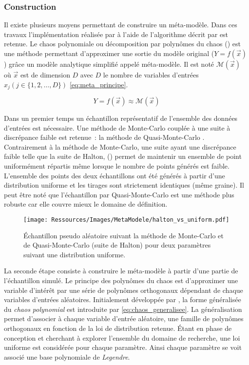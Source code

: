 \subsubsection{Construction} %
\label{ssub:construction}
Il existe plusieurs moyens permettant de construire un méta-modèle. Dans ces travaux
l’implémentation réalisée par \textcite{Rania2013} à l’aide de l’algorithme décrit par
\textcite{Malen2009} est retenue. Le chaos polynomiale ou décomposition par polynômes du
chaos () est une méthode permettant d’approximer une sortie du modèle original
($Y = f(\vec{x})$) grâce un modèle analytique simplifié appelé méta-modèle. Il est noté
$\mathcal{M}(\vec{x})$ où $\vec{x}$ est de dimension $D$ avec $D$ le nombre de variables d’entrées
$x_{j} (j \in \{1, 2, \dotsc, D\})$ \eqref{eq:meta_principe}.

\begin{equation}\label{eq:meta_principe}
  Y = f(\vec{x}) \approx \mathcal{M}(\vec{x})
\end{equation}

Dans un premier temps un échantillon représentatif de l’ensemble des données d’entrées est
nécessaire. Une méthode de Monte-Carlo couplée à une suite à discrépance faible est retenue~: la
méthode de Quasi-Monte-Carlo \parencite{Caflisch19981}. Contrairement à la méthode de
Monte-Carlo, une suite ayant une discrépance faible telle que la suite de Halton,
() permet de maintenir un ensemble de
point uniformément répartis même lorsque le nombre de points générés est faible.
L’ensemble des points des deux échantillons ont été générés à partir d’une
distribution uniforme et les tirages sont strictement identiques (même graine).
Il peut être noté que l’échantillon par Quasi-Monte-Carlo est une méthode plus robuste car elle
couvre mieux le domaine de définition.
\begin{figure}
    \centering
    \texttt{[image: Ressources/Images/MetaModele/halton\_vs\_uniform.pdf]}
    \caption[Échantillon suivant la méthode de Monte-Carlo et de Quasi-Monte-Carlo]
            {Échantillon pseudo aléatoire suivant la méthode de Monte-Carlo et de
             Quasi-Monte-Carlo (suite de Halton) pour deux paramètres suivant une
             distribution uniforme.}
    \label{fig:halton_vs_uniform}
\end{figure}

La seconde étape consiste à construire le méta-modèle à partir d’une partie de
l’échantillon simulé. Le principe des polynômes du chaos est
d’approximer une variable d’intérêt par une série de polynômes orthogonaux dépendant de
chaque variables d’entrées aléatoires. Initialement développée par \textcite{Wiener1938897},
la forme généralisée du \textit{chaos polynomial} est introduite par \textcite{Xiu2002619}
\eqref{eq:chaos_generalisee}. La généralisation permet d’associer à chaque variable
d’entrée aléatoire, une famille de polynômes orthogonaux en fonction de la loi de
distribution retenue. Étant en phase de conception et cherchant à explorer l’ensemble du
domaine de recherche, une loi uniforme est considérée pour chaque paramètre. Ainsi chaque
paramètre se voit associé une base polynomiale de \textit{Legendre}.

